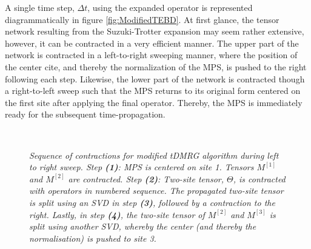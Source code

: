 A single time step, $\Delta t$, using the expanded operator is represented diagrammatically in figure \ref{fig:ModifiedTEBD}. At first glance, the tensor network resulting from the Suzuki-Trotter expansion may seem rather extensive, however, it can be contracted in a very efficient manner. The upper part of the network is contracted in a left-to-right sweeping manner, where the position of the center cite, and thereby the normalization of the MPS, is pushed to the right following each step. Likewise, the lower part of the network is contracted though a right-to-left sweep such that the MPS returns to its original form centered on the first site after applying the final operator. Thereby, the MPS is immediately ready for the subsequent time-propagation.\\
\begin{figure}[h!]
\centering %
\begin{subfigure}[b]{0.4\textwidth}
	\caption{}  
  	
\end{subfigure}
\hspace{10mm}
\begin{subfigure}[b]{0.4\textwidth}
	\caption{}    
  	
\end{subfigure}
\\ %
\vspace{5mm}
\begin{subfigure}[b]{0.4\textwidth}
	\caption{}    	
  	
\end{subfigure}
\hspace{10mm}
\begin{subfigure}[b]{0.4\textwidth}
	\caption{}  
  	
\end{subfigure}
\caption{\textit{Sequence of contractions for modified tDMRG algorithm during left to right sweep. Step \textbf{(1)}: MPS is centered on site 1. Tensors $M^{[1]}$ and $M^{[2]}$ are contracted. Step \textbf{(2)}: Two-site tensor, $\Theta$, is contracted with operators in numbered sequence. The propagated two-site tensor is split using an SVD in step \textbf{(3)}, followed by a contraction to the right. Lastly, in step \textbf{(4)}, the two-site tensor of $M^{[2]}$ and $M^{[3]}$ is split using another SVD, whereby the center (and thereby the normalisation) is pushed to site 3.}}
\label{fig:TEBDContraction}
\end{figure}
